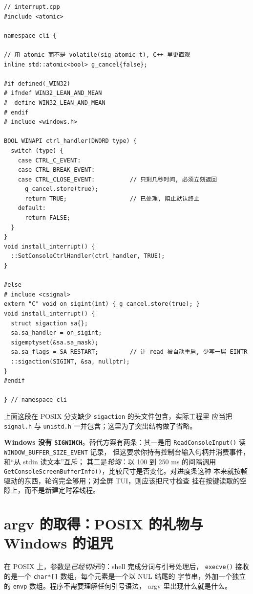 \documentclass[12pt,a4paper,fontset=fandol]{ctexbook}
\newcommand{\Fn}[1]{\texttt{#1()}}
\newcommand{\Tp}[1]{\texttt{#1}}
\newcommand{\Bk}{\allowbreak}
\begin{document}
\begin{lstlisting}[caption={中断处理的双平台骨架}]
// interrupt.cpp
#include <atomic>

namespace cli {

// 用 atomic 而不是 volatile(sig_atomic_t), C++ 里更直观
inline std::atomic<bool> g_cancel{false};

#if defined(_WIN32)
# ifndef WIN32_LEAN_AND_MEAN
#  define WIN32_LEAN_AND_MEAN
# endif
# include <windows.h>

BOOL WINAPI ctrl_handler(DWORD type) {
  switch (type) {
    case CTRL_C_EVENT:
    case CTRL_BREAK_EVENT:
    case CTRL_CLOSE_EVENT:          // 只剩几秒时间, 必须立刻返回
      g_cancel.store(true);
      return TRUE;                  // 已处理, 阻止默认终止
    default:
      return FALSE;
  }
}
void install_interrupt() {
  ::SetConsoleCtrlHandler(ctrl_handler, TRUE);
}

#else
# include <csignal>
extern "C" void on_sigint(int) { g_cancel.store(true); }
void install_interrupt() {
  struct sigaction sa{};
  sa.sa_handler = on_sigint;
  sigemptyset(&sa.sa_mask);
  sa.sa_flags = SA_RESTART;         // 让 read 被自动重启, 少写一层 EINTR
  ::sigaction(SIGINT, &sa, nullptr);
}
#endif

} // namespace cli
\end{lstlisting}

上面这段在 POSIX 分支缺少 \Tp{sigaction} 的头文件包含，实际工程里
应当把 \Tp{signal.h} 与 \Tp{unistd.h} 一并包含；这里为了突出结构做了省略。

\textbf{Windows 没有 \Tp{SIGWINCH}}。替代方案有两条：其一是用
\Fn{Read{\Bk}Console{\Bk}Input} 读 \Tp{WINDOW\_{\Bk}BUFFER\_{\Bk}SIZE\_{\Bk}EVENT} 记录，
但这要求你持有控制台输入句柄并消费事件，和``从 stdin 读文本''互斥；
其二是\emph{轮询}：以 100 到 250 ms 的间隔调用
\Fn{Get{\Bk}Console{\Bk}Screen{\Bk}Buffer{\Bk}Info}，比较尺寸是否变化。对进度条这种
本来就按帧驱动的东西，轮询完全够用；对全屏 TUI，则应该把尺寸检查
挂在按键读取的空隙上，而不是新建定时器线程。

\section{argv 的取得：POSIX 的礼物与 Windows 的诅咒}

在 POSIX 上，参数是\emph{已经切好}的：shell 完成分词与引号处理后，
\Fn{execve} 接收的是一个 \Tp{char*[]} 数组，每个元素是一个以 NUL 结尾的
字节串，外加一个独立的 \Tp{envp} 数组。程序不需要理解任何引号语法，
argv 里出现什么就是什么。
\end{document}
